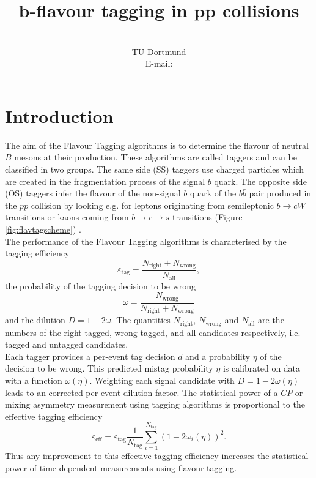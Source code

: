 \documentclass{PoS}
\title{$\bm{b}$-flavour tagging in $\bm{p\!p}$ collisions}
\author{\speaker{Alex Birnkraut}\\%
        TU Dortmund\\
        E-mail: \email{a.birnkraut@cern.ch}}
\begin{document}
\section{Introduction}\label{sec:1}

The aim of the Flavour Tagging algorithms is to determine the flavour of neutral $B$ mesons at their production. These algorithms are called taggers and can be classified in two groups. The same side (SS) taggers use charged particles which are created in the fragmentation process of the signal $b$ quark. The opposite side (OS) taggers infer the flavour of the non-signal $b$ quark of the $b\bar{b}$ pair produced in the $p\!p$ collision by looking e.g. for leptons originating from semileptonic $b\to cW$ transitions or kaons coming from $b\to c\to s$ transitions (Figure \ref{fig:flavtagscheme}) \cite{1}.\\
The performance of the Flavour Tagging algorithms is characterised by the tagging efficiency
\begin{equation}
\varepsilon_\text{tag}=\frac{N_\text{right}+N_\text{wrong}}{N_\text{all}},
\end{equation}
the probability of the tagging decision to be wrong
\begin{equation}
\omega=\frac{N_\text{wrong}}{N_\text{right}+N_\text{wrong}}
\end{equation}
and the dilution $D=1-2\omega$. The quantities $N_\text{right}$, $N_\text{wrong}$ and $N_\text{all}$ are the numbers of the right tagged, wrong tagged, and all candidates respectively, i.e. tagged and untagged candidates.\\ 
Each tagger provides a per-event tag decision $d$ and a probability $\eta$ of the decision to be wrong. This predicted mistag probability $\eta$ is calibrated on data with a function $\omega(\eta)$. Weighting each signal candidate with $D=1-2\omega(\eta)$ leads to an corrected per-event dilution factor. The statistical power of a $C\!P$ or mixing asymmetry measurement using tagging algorithms is proportional to the effective tagging efficiency
\begin{equation}
\varepsilon_\text{eff}= \varepsilon_\text{tag}\frac{1}{N_\text{tag}}\sum_{i=1}^{N_\text{tag}}\left(1-2\omega_i(\eta)\right)^2.
\end{equation}
Thus any improvement to this effective tagging efficiency increases the statistical power of time dependent measurements using flavour tagging.
\end{document}
